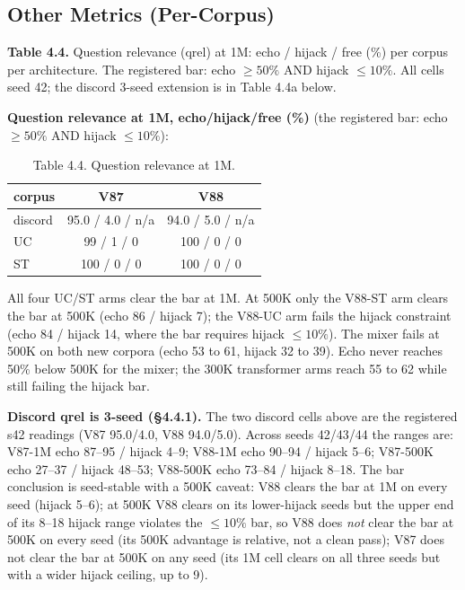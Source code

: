 \documentclass[11pt]{article}
\begin{document}
\subsection{Other Metrics (Per-Corpus)}

\textbf{Table 4.4.} Question relevance (qrel) at 1M: echo / hijack / free (\%) per corpus per architecture. The registered bar: echo $\geq 50\%$ AND hijack $\leq 10\%$. All cells seed 42; the discord 3-seed extension is in Table 4.4a below.

\textbf{Question relevance at 1M, echo/hijack/free (\%)} (the registered bar: echo $\geq 50\%$ AND hijack $\leq 10\%$):

\begin{table}[!t]
\centering
\small
\caption*{Table 4.4. Question relevance at 1M.}
\begin{tabular}{lcc}
\toprule
corpus & V87 & V88 \\
\midrule
discord & 95.0 / 4.0 / n/a & 94.0 / 5.0 / n/a \\
UC & 99 / 1 / 0 & 100 / 0 / 0 \\
ST & 100 / 0 / 0 & 100 / 0 / 0 \\
\bottomrule
\end{tabular}
\end{table}

All four UC/ST arms clear the bar at 1M. At 500K only the V88-ST arm clears the bar at 500K (echo 86 / hijack 7); the V88-UC arm fails the hijack constraint (echo 84 / hijack 14, where the bar requires hijack $\leq 10\%$). The mixer fails at 500K on both new corpora (echo 53 to 61, hijack 32 to 39). Echo never reaches 50\% below 500K for the mixer; the 300K transformer arms reach 55 to 62 while still failing the hijack bar.

\textbf{Discord qrel is 3-seed (\S4.4.1).} The two discord cells above are the registered s42 readings (V87 95.0/4.0, V88 94.0/5.0). Across seeds 42/43/44 the ranges are: V87-1M echo 87--95 / hijack 4--9; V88-1M echo 90--94 / hijack 5--6; V87-500K echo 27--37 / hijack 48--53; V88-500K echo 73--84 / hijack 8--18. The bar conclusion is seed-stable with a 500K caveat: V88 clears the bar at 1M on every seed (hijack 5--6); at 500K V88 clears on its lower-hijack seeds but the upper end of its 8--18 hijack range violates the $\leq 10\%$ bar, so V88 does \emph{not} clear the bar at 500K on every seed (its 500K advantage is relative, not a clean pass); V87 does not clear the bar at 500K on any seed (its 1M cell clears on all three seeds but with a wider hijack ceiling, up to 9).
\end{document}

